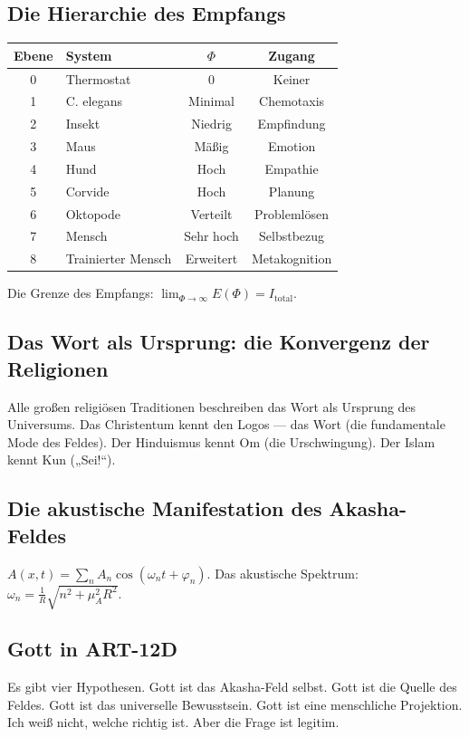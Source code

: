 \documentclass[11pt,a4paper]{article}
\begin{document}
\subsection{Die Hierarchie des Empfangs}
\begin{table}[H]
\centering
\begin{tabular}{@{}clcc@{}}
\toprule
\textbf{Ebene} & \textbf{System} & \textbf{$\Phi$} & \textbf{Zugang} \\ \midrule
0 & Thermostat & 0 & Keiner \\
1 & C. elegans & Minimal & Chemotaxis \\
2 & Insekt & Niedrig & Empfindung \\
3 & Maus & Mäßig & Emotion \\
4 & Hund & Hoch & Empathie \\
5 & Corvide & Hoch & Planung \\
6 & Oktopode & Verteilt & Problemlösen \\
7 & Mensch & Sehr hoch & Selbstbezug \\
8 & Trainierter Mensch & Erweitert & Metakognition \\ \bottomrule
\end{tabular}
\end{table}
Die Grenze des Empfangs: $\lim_{\Phi \rightarrow \infty} E(\Phi) = I_{\text{total}}$.

\subsection{Das Wort als Ursprung: die Konvergenz der Religionen}
Alle großen religiösen Traditionen beschreiben das Wort als Ursprung des Universums. Das Christentum kennt den Logos --- das Wort (die fundamentale Mode des Feldes). Der Hinduismus kennt Om (die Urschwingung). Der Islam kennt Kun („Sei!``).

\subsection{Die akustische Manifestation des Akasha-Feldes}
$A(x,t) = \sum_n A_n \cos(\omega_n t + \varphi_n)$. Das akustische Spektrum: $\omega_n = \frac{1}{R} \sqrt{n^2 + \mu_A^2 R^2}$.

\subsection{Gott in ART-12D}
Es gibt vier Hypothesen. Gott ist das Akasha-Feld selbst. Gott ist die Quelle des Feldes. Gott ist das universelle Bewusstsein. Gott ist eine menschliche Projektion. Ich weiß nicht, welche richtig ist. Aber die Frage ist legitim.
\end{document}
